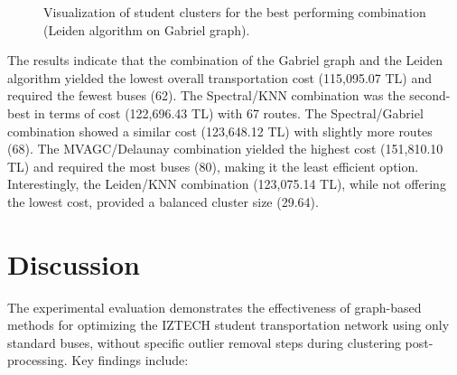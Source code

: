 \begin{figure}[h]
    \centering
    \caption{Visualization of student clusters for the best performing combination (Leiden algorithm on Gabriel graph).}
    \label{fig:best_clustering_viz}
\end{figure}

The results indicate that the combination of the Gabriel graph and the Leiden algorithm yielded the lowest overall transportation cost (115,095.07 TL) and required the fewest buses (62). The Spectral/KNN combination was the second-best in terms of cost (122,696.43 TL) with 67 routes. The Spectral/Gabriel combination showed a similar cost (123,648.12 TL) with slightly more routes (68). The MVAGC/Delaunay combination yielded the highest cost (151,810.10 TL) and required the most buses (80), making it the least efficient option. Interestingly, the Leiden/KNN combination (123,075.14 TL), while not offering the lowest cost, provided a balanced cluster size (29.64).

\section{Discussion}
\label{sec:discussion}

The experimental evaluation demonstrates the effectiveness of graph-based methods for optimizing the IZTECH student transportation network using only standard buses, without specific outlier removal steps during clustering post-processing. Key findings include:

